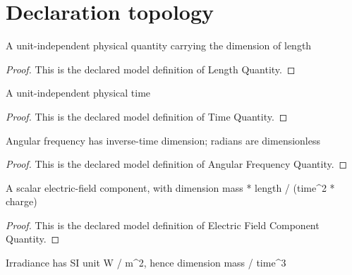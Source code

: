 \section{Declaration topology}
\begin{definition}
  \label{def:physics:phyx-mini-0120:phyxminiproblems-problemphyxmini0120-lengthquantity}
  A unit-independent physical quantity carrying the dimension of length
\end{definition}
\begin{proof}
  This is the declared model definition of Length Quantity.
\end{proof}
\begin{definition}
  \label{def:physics:phyx-mini-0120:phyxminiproblems-problemphyxmini0120-timequantity}
  A unit-independent physical time
\end{definition}
\begin{proof}
  This is the declared model definition of Time Quantity.
\end{proof}
\begin{definition}
  \label{def:physics:phyx-mini-0120:phyxminiproblems-problemphyxmini0120-angularfrequencyquantity}
  Angular frequency has inverse-time dimension; radians are dimensionless
\end{definition}
\begin{proof}
  This is the declared model definition of Angular Frequency Quantity.
\end{proof}
\begin{definition}
  \label{def:physics:phyx-mini-0120:phyxminiproblems-problemphyxmini0120-electricfieldcomponentquantity}
  A scalar electric-field component, with dimension mass * length / (time\textasciicircum{}2 * charge)
\end{definition}
\begin{proof}
  This is the declared model definition of Electric Field Component Quantity.
\end{proof}
\begin{definition}
  \label{def:physics:phyx-mini-0120:phyxminiproblems-problemphyxmini0120-irradiancequantity}
  Irradiance has SI unit W / m\textasciicircum{}2, hence dimension mass / time\textasciicircum{}3
\end{definition}

